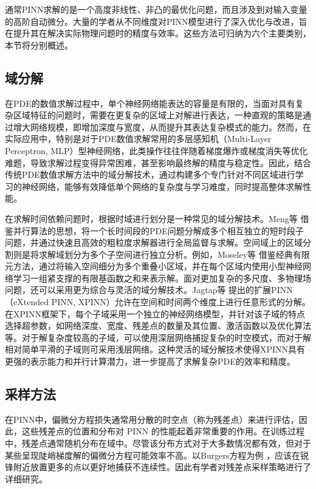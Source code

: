 通常PINN求解的是一个高度非线性、非凸的最优化问题，而且涉及到对输入变量的高阶自动微分。大量的学者从不同维度对PINN模型进行了深入优化与改进，旨在提升其在解决实际物理问题时的精度与效率。这些方法可归纳为六个主要类别，本节将分别概述。

\subsection{域分解}

在PDE的数值求解过程中，单个神经网络能表达的容量是有限的，当面对具有复杂区域特征的问题时，需要在更复杂的区域上对解进行表达，一种直观的策略是通过增大网络规模，即增加深度与宽度，从而提升其表达复杂模式的能力。然而，在实际应用中，特别是对于PDE数值求解常用的多层感知机（Multi-Layer Perceptron, MLP）型神经网络，此类操作往往伴随着梯度爆炸或梯度消失等优化难题，导致求解过程变得异常困难，甚至影响最终解的精度与稳定性。因此，结合传统PDE数值求解方法中的域分解技术，通过构建多个专门针对不同区域进行学习的神经网络，能够有效降低单个网络的复杂度与学习难度，同时提高整体求解性能。

在求解时间依赖问题时，根据时域进行划分是一种常见的域分解技术。Meng等 \cite{meng2020ppinn}借鉴并行算法的思想，将一个长时间段的PDE问题分解成多个相互独立的短时段子问题，并通过快速且高效的粗粒度求解器进行全局监督与求解。空间域上的区域分割则是将求解域划分为多个子空间进行独立分析。例如，Moseley等 \cite{moseley2023finite}借鉴经典有限元方法，通过将输入空间细分为多个重叠小区域，并在每个区域内使用小型神经网络学习一组紧支撑的有限基函数之和来表示解。面对更加复杂的多尺度、多物理场问题，还可以采用更为综合与灵活的域分解技术。Jagtap等 \cite{jagtap2020extended}提出的扩展PINN（eXtended PINN, XPINN）允许在空间和时间两个维度上进行任意形式的分解。在XPINN框架下，每个子域采用一个独立的神经网络模型，并针对该子域的特点选择超参数，如网络深度、宽度、残差点的数量及其位置、激活函数以及优化算法等。对于解复杂度较高的子域，可以使用深层网络捕捉复杂的时空模式，而对于解相对简单平滑的子域则可采用浅层网络。这种灵活的域分解技术使得XPINN具有更强的表示能力和并行计算潜力，进一步提高了求解复杂PDE的效率和精度。

\subsection{采样方法}

在PINN中，偏微分方程损失通常用分散的时空点（称为残差点）来进行评估，因此，这些残差点的位置和分布对 PINN 的性能起着非常重要的作用。在训练过程中，残差点通常随机分布在域中。尽管该分布方式对于大多数情况都有效，但对于某些呈现陡峭梯度解的偏微分方程可能效率不高。以Burgers方程为例 \cite{lu2021deepxde}，应该在锐锋附近放置更多的点以更好地捕获不连续性。因此有学者对残差点采样策略进行了详细研究。

